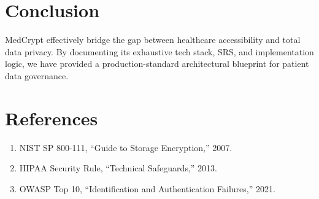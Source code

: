 \documentclass[conference,onecolumn]{IEEEtran}
\begin{document}
\section{Conclusion}
MedCrypt effectively bridge the gap between healthcare accessibility and total data privacy. By documenting its exhaustive tech stack, SRS, and implementation logic, we have provided a production-standard architectural blueprint for patient data governance.

\section{References}
\begin{enumerate}
    \item NIST SP 800-111, ``Guide to Storage Encryption,'' 2007.
    \item HIPAA Security Rule, ``Technical Safeguards,'' 2013.
    \item OWASP Top 10, ``Identification and Authentication Failures,'' 2021.
\end{enumerate}
\end{document}
